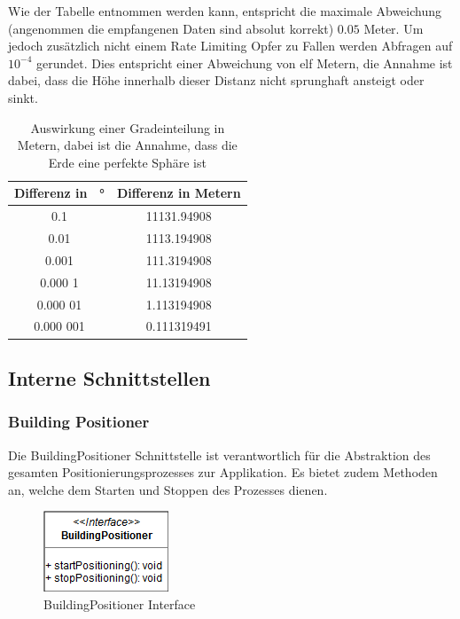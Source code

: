 \documentclass[a4paper]{scrreprt}
\begin{document}
Wie der Tabelle entnommen werden kann, entspricht die maximale Abweichung (angenommen die empfangenen Daten sind absolut korrekt) $0.05$ Meter. Um jedoch zusätzlich nicht einem Rate Limiting Opfer zu Fallen werden Abfragen auf $10^{-4}$ gerundet. Dies entspricht einer Abweichung von elf Metern, die Annahme ist dabei, dass die Höhe innerhalb dieser Distanz nicht sprunghaft ansteigt oder sinkt.

\begin{table}[htb]
	\centering
	\begin{tabular}{|c|c|}
		\hline
		\textbf{Differenz in \SI{}{\degree}} & \textbf{Differenz in Metern}\\
		\hline
		0.1 & 11131.94908 \\
		\hline
		0.01 & 1113.194908 \\
		\hline
		0.001 & 111.3194908 \\
		\hline
		0.000 1 & 11.13194908 \\
		\hline
		0.000 01 & 1.113194908 \\
		\hline
		0.000 001 & 0.111319491 \\
		\hline
	\end{tabular} 
	\caption{Auswirkung einer Gradeinteilung in Metern, dabei ist die Annahme, dass die Erde eine perfekte Sphäre ist}
	\label{tab:GradMeter}
\end{table}

\subsection{Interne Schnittstellen}

\subsubsection{Building Positioner}
Die BuildingPositioner Schnittstelle ist verantwortlich für die Abstraktion des gesamten Positionierungsprozesses zur Applikation. Es bietet zudem Methoden an, welche dem Starten und Stoppen des Prozesses dienen.
\begin{figure}[h!]
	\center
	\includegraphics[scale=0.75]{BuildingPositioner.png}
	\caption{BuildingPositioner Interface}
\end{figure}
\end{document}
